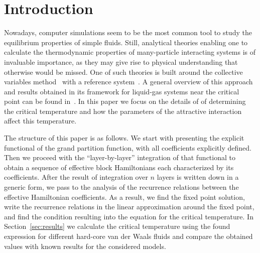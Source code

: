 \section{Introduction}

Nowadays, computer simulations seem to be the most common tool to study the equilibrium properties of simple fluids. Still, analytical theories enabling one to calculate the thermodynamic properties of many-particle interacting systems is of invaluable importance, as they may give rise to physical understanding that otherwise would be missed. One of such theories is built around the collective variables method~\cite{Yukh1980book} with a reference system~\cite{Yukh1990}. A general overview of this approach and results obtained in its framework for liquid-gas systems near the critical point can be found in~\cite{Yukh2015En}. In this paper we focus on the details of of determining the critical temperature and how the parameters of the attractive interaction affect this temperature. 

The structure of this paper is as follows. We start with presenting the explicit functional of the grand partition function, with all coefficients explicitly defined. Then we proceed with the ``layer-by-layer'' integration of that functional to obtain a sequence of effective block Hamiltonians each characterized by its coefficients. After the result of integration over $n$ layers is written down in a generic form, we pass to the analysis of the recurrence relations between the effective Hamiltonian coefficients. As a result, we find the fixed point solution, write the recurrence relations in the linear approximation around the fixed point, and find the condition resulting into the equation for the critical temperature. In Section~\ref{sec:results} we calculate the critical temperature using the found expression for different hard-core van der Waals fluids and compare the obtained values with known results for the considered models.

